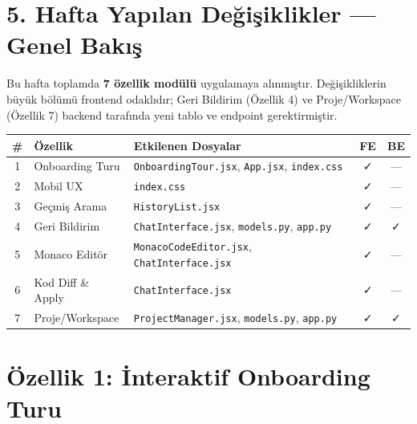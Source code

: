\documentclass[12pt,a4paper]{article}
\begin{document}
\section{5. Hafta Yapılan Değişiklikler — Genel Bakış}

Bu hafta toplamda \textbf{7 özellik modülü} uygulamaya alınmıştır. Değişikliklerin büyük bölümü frontend odaklıdır; Geri Bildirim (Özellik 4) ve Proje/Workspace (Özellik 7) backend tarafında yeni tablo ve endpoint gerektirmiştir.

\vspace{0.4cm}

{\footnotesize
\begin{tabularx}{\textwidth}{clXcc}
\toprule
\textbf{\#} & \textbf{Özellik} & \textbf{Etkilenen Dosyalar} & \textbf{FE} & \textbf{BE} \\
\midrule
1 & Onboarding Turu     & \texttt{OnboardingTour.jsx}, \texttt{App.jsx}, \texttt{index.css} & \textcolor{successgreen}{✓} & — \\
2 & Mobil UX            & \texttt{index.css}                                                & \textcolor{successgreen}{✓} & — \\
3 & Geçmiş Arama        & \texttt{HistoryList.jsx}                                          & \textcolor{successgreen}{✓} & — \\
4 & Geri Bildirim       & \texttt{ChatInterface.jsx}, \texttt{models.py}, \texttt{app.py}   & \textcolor{successgreen}{✓} & \textcolor{successgreen}{✓} \\
5 & Monaco Editör       & \texttt{MonacoCodeEditor.jsx}, \texttt{ChatInterface.jsx}         & \textcolor{successgreen}{✓} & — \\
6 & Kod Diff \& Apply   & \texttt{ChatInterface.jsx}                                        & \textcolor{successgreen}{✓} & — \\
7 & Proje/Workspace     & \texttt{ProjectManager.jsx}, \texttt{models.py}, \texttt{app.py} & \textcolor{successgreen}{✓} & \textcolor{successgreen}{✓} \\
\bottomrule
\end{tabularx}
}

\newpage

\section{Özellik 1: İnteraktif Onboarding Turu}
\end{document}
